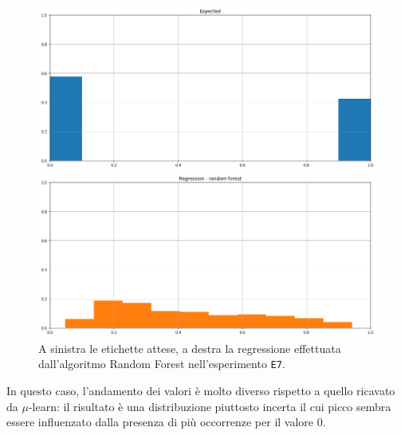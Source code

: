 \documentclass[12pt]{report}
\theoremstyle{definition}
\begin{document}
\begin{figure}
\centering
    \begin{minipage}{0.48\textwidth}
        \includegraphics[width=\linewidth]{images/experiment_kaggle/expected_classification.png}
    \end{minipage}
    \begin{minipage}{0.48\textwidth}
        \includegraphics[width=\linewidth]{images/experiment_kaggle/prediction_regression_rf.png}
    \end{minipage}
    \caption{A sinistra le etichette attese, a destra la regressione effettuata dall'algoritmo Random Forest nell'esperimento \texttt{E7}.}
    \label{rf_exp7}
\end{figure} 
In questo caso, l'andamento dei valori è molto diverso rispetto a quello ricavato da $\mu$-learn: il risultato è una distribuzione piuttosto incerta il cui picco sembra essere influenzato dalla presenza di più occorrenze per il valore 0.
\end{document}
